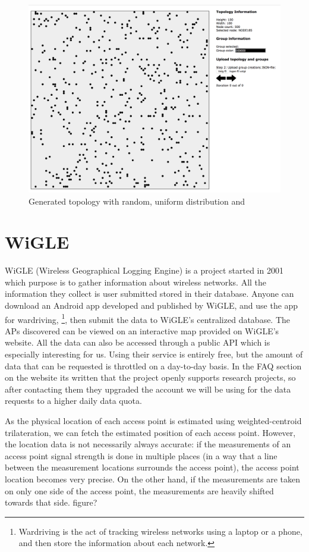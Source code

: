 \begin{figure}[h]
\center
\includegraphics[scale=0.35]{Images/interface.png}
\caption{Generated topology with random, uniform distribution and}
\label{fig:randtop}
\end{figure}

\section{WiGLE}
WiGLE (Wireless Geographical Logging Engine) \cite{wigle} is a project started in 2001 which purpose is to gather information about wireless networks. All the information
they collect is user submitted stored in their database. Anyone can download an Android app developed and published by WiGLE, and use the app for wardriving,
\footnote{Wardriving is the act of tracking wireless networks using a laptop or a phone,	and then store the information about each network.},
	then submit the data to WiGLE's centralized database. The APs discovered can be viewed on an interactive map provided on WiGLE's website. 
	All the data can also be accessed through a public API which is especially interesting for us. Using their service is entirely free, but the
	amount of data that can be requested is throttled on a day-to-day basis. In the FAQ section on the website its written that the project openly supports research projects, 
	so after contacting them they upgraded the account we will be using for the data requests to a higher daily data quota.

	As the physical location of each access point is estimated using weighted-centroid trilateration, 
	we can fetch the estimated position of each access point. However, the location data is not necessarily always accurate: if the measurements of an access point signal
	strength is done in multiple places (in a way that a line between the measurement locations surrounds the access point), the access point location becomes very precise. 
	On the other hand, if the measurements are taken on only one side of the access point, the measurements are heavily shifted towards that side. {{figure?}} 
	
